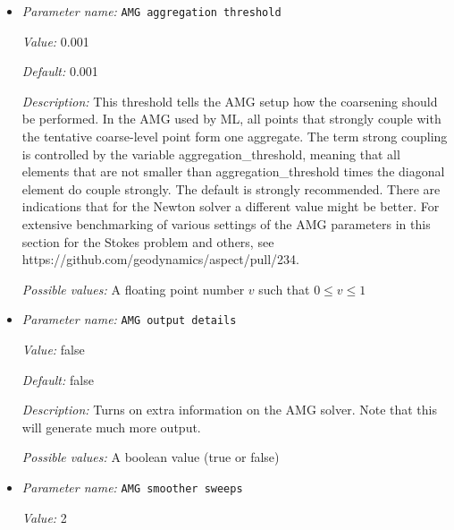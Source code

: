 \begin{itemize}
\item {\it Parameter name:} {\tt AMG aggregation threshold}
\label{parameters:Solver parameters/AMG parameters/AMG aggregation threshold}
\label{parameters:Solver_20parameters/AMG_20parameters/AMG_20aggregation_20threshold}


{\it Value:} 0.001


{\it Default:} 0.001


{\it Description:} This threshold tells the AMG setup how the coarsening should be performed. In the AMG used by ML, all points that strongly couple with the tentative coarse-level point form one aggregate. The term strong coupling is controlled by the variable aggregation\_threshold, meaning that all elements that are not smaller than aggregation\_threshold times the diagonal element do couple strongly. The default is strongly recommended. There are indications that for the Newton solver a different value might be better. For extensive benchmarking of various settings of the AMG parameters in this section for the Stokes problem and others, see https://github.com/geodynamics/aspect/pull/234.


{\it Possible values:} A floating point number $v$ such that $0 \leq v \leq 1$
\item {\it Parameter name:} {\tt AMG output details}
\label{parameters:Solver parameters/AMG parameters/AMG output details}
\label{parameters:Solver_20parameters/AMG_20parameters/AMG_20output_20details}


{\it Value:} false


{\it Default:} false


{\it Description:} Turns on extra information on the AMG solver. Note that this will generate much more output.


{\it Possible values:} A boolean value (true or false)
\item {\it Parameter name:} {\tt AMG smoother sweeps}
\label{parameters:Solver parameters/AMG parameters/AMG smoother sweeps}
\label{parameters:Solver_20parameters/AMG_20parameters/AMG_20smoother_20sweeps}


{\it Value:} 2



\end{itemize}
